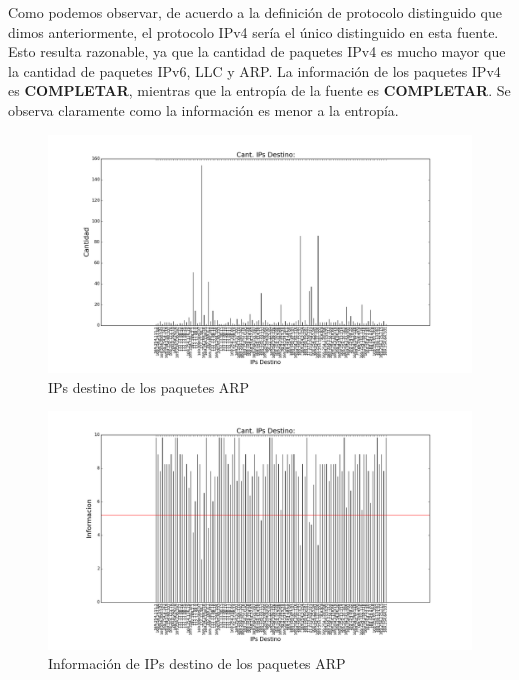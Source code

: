 Como podemos observar, de acuerdo a la definición de protocolo distinguido que dimos anteriormente, el protocolo IPv4 sería el único distinguido en esta fuente. Esto resulta razonable, ya que la cantidad de paquetes IPv4 es mucho mayor que la cantidad de paquetes IPv6, LLC y ARP. La información de los paquetes IPv4 es \textbf{COMPLETAR}, mientras que la entropía de la fuente es \textbf{COMPLETAR}. Se observa claramente como la información es menor a la entropía.

\begin{figure}[H]
       \centering
       \includegraphics[width=1\textwidth]{../resultados/McDonalds/histogram_dst.png}
       \caption{IPs destino de los paquetes ARP}
       \label{red-hogarena-arp-destination}
\end{figure}

\begin{figure}[H]
       \centering
       \includegraphics[width=1\textwidth]{../resultados/McDonalds/histogram_dst_information.png}
       \caption{Información de IPs destino de los paquetes ARP}
       \label{red-hogarena-arp-destination-info}
\end{figure}

